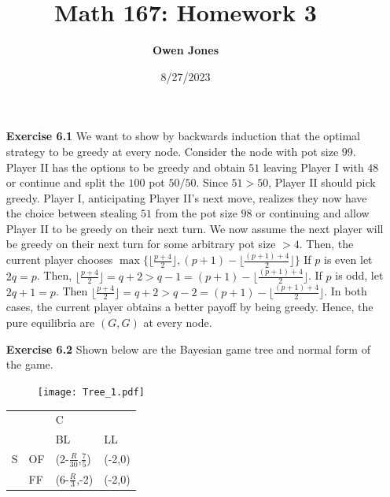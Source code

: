 \documentclass[10pt]{article}[H]
\title{\bf Math 167: Homework 3}
\date{8/27/2023}
\author{\bf Owen Jones}
\begin{document}
\maketitle
\begin{itemize}
    \item [\textbf{Exercise 6.1}] We want to show by backwards induction that the optimal strategy to be greedy at every node. 
    Consider the node with pot size $99$. Player II has the options to be greedy and obtain $51$ leaving Player I with $48$ or continue and split the $100$ pot $50/50$. Since $51>50$, Player II should pick greedy. 
    Player I, anticipating Player II's next move, realizes they now have the choice between stealing $51$ from the pot size $98$ or continuing and allow Player II to be greedy on their next turn. 
    We now assume the next player will be greedy on their next turn for some arbitrary pot size $>4$. 
    Then, the current player chooses $\max\{\lfloor\frac{p+4}{2}\rfloor,(p+1)-\lfloor\frac{(p+1)+4}{2}\rfloor\}$ 
    If $p$ is even let $2q=p$. Then, $\lfloor\frac{p+4}{2}\rfloor=q+2>q-1=(p+1)-\lfloor\frac{(p+1)+4}{2}\rfloor$. 
    If $p$ is odd, let $2q+1=p$. Then $\lfloor\frac{p+4}{2}\rfloor=q+2>q-2=(p+1)-\lfloor\frac{(p+1)+4}{2}\rfloor$.
    In both cases, the current player obtains a better payoff by being greedy. 
    Hence, the pure equilibria are $(G,G)$ at every node. 
    \item [\textbf{Exercise 6.2}] Shown below are the Bayesian game tree and normal form of the game.
    \begin{figure}[H]
        \texttt{[image: Tree\_1.pdf]}    
    \end{figure} 
    \begin{table}[H]
        \begin{tabular}{llll}
                               &                         & C                                                     &                             \\ \cline{2-4} 
        \multicolumn{1}{l|}{}  & \multicolumn{1}{l|}{}   & \multicolumn{1}{l|}{BL}                               & \multicolumn{1}{l|}{LL}     \\ \cline{2-4} 
        \multicolumn{1}{l|}{S} & \multicolumn{1}{l|}{OF} & \multicolumn{1}{l|}{(2-$\frac{R}{30}$,$\frac{7}{5}$)} & \multicolumn{1}{l|}{(-2,0)} \\ \cline{2-4} 
        \multicolumn{1}{l|}{}  & \multicolumn{1}{l|}{FF} & \multicolumn{1}{l|}{(6-$\frac{R}{3}$,-2)}             & \multicolumn{1}{l|}{(-2,0)} \\ \cline{2-4} 

\end{tabular}
\end{table}
\end{itemize}
\end{document}
